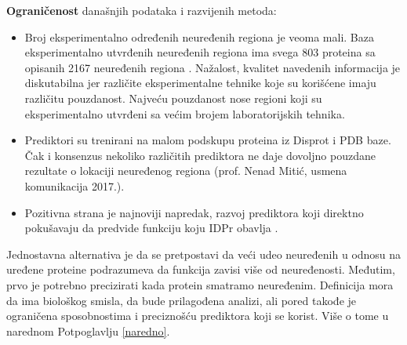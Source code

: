 \textbf{Ograničenost} današnjih podataka i razvijenih metoda:
\begin{itemize}
  \item Broj eksperimentalno određenih neuređenih regiona je veoma mali.
    Baza eksperimentalno utvrđenih neuređenih regiona  ima
    svega 803 proteina sa opisanih 2167 neuređenih regiona \parencite{Piovesan2016}.
    Nažalost, kvalitet navedenih informacija je diskutabilna jer različite
    eksperimentalne tehnike koje su korišćene imaju različitu pouzdanost.
    Najveću pouzdanost nose regioni koji su eksperimentalno utvrđeni sa 
    većim brojem laboratorijskih tehnika.
  \item Prediktori su trenirani na malom podskupu proteina iz Disprot i PDB  baze.
    Čak i konsenzus nekoliko različitih prediktora ne daje dovoljno pouzdane
    rezultate o lokaciji neuređenog regiona (prof. Nenad Mitić, usmena komunikacija
    2017.).
  \item 
    Pozitivna strana je najnoviji napredak, razvoj prediktora koji direktno
    pokušavaju da predvide funkciju koju IDPr obavlja \parencite{Meng_c2017}.

\end{itemize}

Jednostavna alternativa je da se pretpostavi da veći udeo neuređenih u odnosu
na uređene proteine podrazumeva da funkcija zavisi više od neuređenosti. 
Međutim, prvo je potrebno precizirati kada protein smatramo
neuređenim.  Definicija mora da ima biološkog smisla, da bude prilagođena
analizi, ali pored takođe je ograničena sposobnostima i preciznošću prediktora
koji se korist.  Više o tome u narednom Potpoglavlju \ref{naredno}.


